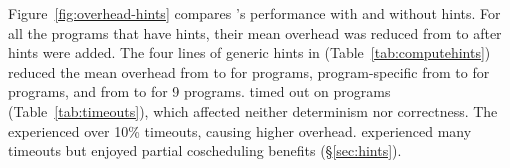 Figure~\ref{fig:overhead-hints} compares \xxx's performance with and
without hints.  For all the \nprogneedhints programs that 
have hints, their mean overhead was reduced from
\overallnohints to \overallhints after hints were added. The four lines of generic
\compute hints in \libgomp (Table~\ref{tab:computehints}) 
reduced the mean overhead from \genericnolineup
to \genericlineup for \nproggenericlineuphints programs, program-specific
\computes from \specificnolineup to \specificlineup for
\nprogspecificlineuphints programs, and \nondets from \nondetnohints
to \nondethints for 9 programs.  \Computes timed out on
\nlineupfails programs (Table~\ref{tab:timeouts}), which affected neither
determinism nor correctness. The  \kmeans experienced over 10\% timeouts,
causing higher overhead. \xtwosixfour experienced many timeouts
but enjoyed partial coscheduling benefits (\S\ref{sec:hints}).







